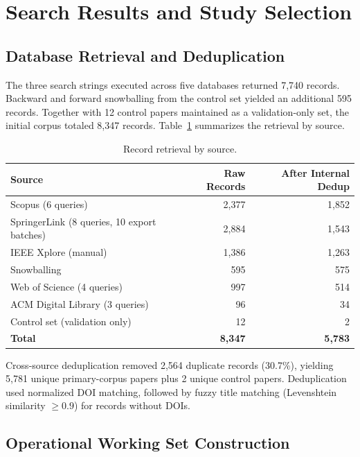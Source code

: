 \section{Search Results and Study Selection}
\label{sec:slr-results-selection}

\subsection{Database Retrieval and Deduplication}

The three search strings executed across five databases returned 7{,}740
records. Backward and forward snowballing from the control set yielded an
additional 595 records. Together with 12 control papers maintained as a
validation-only set, the initial corpus totaled 8{,}347 records.
Table~\ref{tab:retrieval} summarizes the retrieval by source.

\begin{table}[htbp]
\centering
\caption{Record retrieval by source.}
\label{tab:retrieval}
\begin{tabular}{lrr}
\toprule
\textbf{Source} & \textbf{Raw Records} & \textbf{After Internal Dedup} \\
\midrule
Scopus (6 queries)      & 2{,}377 & 1{,}852 \\
SpringerLink (8 queries, 10 export batches) & 2{,}884 & 1{,}543 \\
IEEE Xplore (manual)    & 1{,}386 & 1{,}263 \\
Snowballing             &   595   &   575   \\
Web of Science (4 queries) & 997  &   514   \\
ACM Digital Library (3 queries) & 96 &  34  \\
Control set (validation only) & 12 &    2   \\
\midrule
\textbf{Total} & \textbf{8{,}347} & \textbf{5{,}783} \\
\bottomrule
\end{tabular}
\end{table}

Cross-source deduplication removed 2{,}564 duplicate records (30.7\%),
yielding 5{,}781 unique primary-corpus papers plus 2 unique control papers.
Deduplication used normalized DOI matching, followed by fuzzy title matching
(Levenshtein similarity $\geq 0.9$) for records without DOIs.

\subsection{Operational Working Set Construction}

